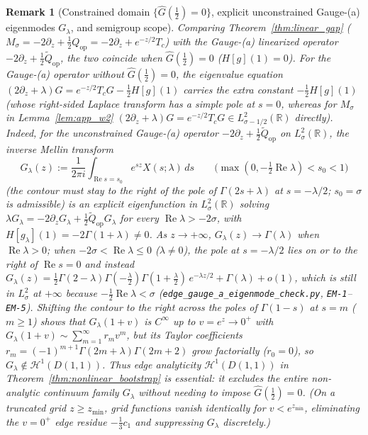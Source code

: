 \documentclass[11pt,a4paper]{article}
\newtheorem{remark}{Remark}
\begin{document}
\begin{remark}[Constrained domain $\{\widehat{G}(\tfrac12)=0\}$, explicit unconstrained Gauge-(a) eigenmodes $G_\lambda$, and semigroup scope]
\label{rem:w3_scope}
Comparing Theorem~\ref{thm:linear_gap} ($M_\sigma=-2\partial_z+\tfrac12 Q_{\mathrm{op}}=-2\partial_z+e^{-z/2}T_c$) with the Gauge-(a) linearized operator $-2\partial_z+\tfrac12\widetilde{Q}_{\mathrm{op}}$, the two coincide when $\widehat{G}(\tfrac12)=0$ ($H[g](1)=0$). For the Gauge-(a) operator without $\widehat{G}(\tfrac12)=0$, the eigenvalue equation $(2\partial_z+\lambda)G=e^{-z/2}T_c G-\tfrac12 H[g](1)$ carries the extra constant $-\tfrac12 H[g](1)$ (whose right-sided Laplace transform has a simple pole at $s=0$, whereas for $M_\sigma$ in Lemma~\ref{lem:app_w2} $(2\partial_z+\lambda)G=e^{-z/2}T_c G\in L^2_{\sigma-1/2}(\mathbb{R})$ directly).
Indeed, for the \emph{unconstrained} Gauge-(a) operator $-2\partial_z+\tfrac12\widetilde{Q}_{\mathrm{op}}$
on $L^2_\sigma(\mathbb{R})$, the inverse Mellin transform
\[
G_\lambda(z) := \frac{1}{2\pi i}\int_{\operatorname{Re}s=s_0} e^{sz}X(s;\lambda)\,ds
\qquad \bigl(\max(0,-\tfrac12\operatorname{Re}\lambda)<s_0<1\bigr)
\]
(the contour must stay to the right of the pole of $\Gamma(2s+\lambda)$ at $s=-\lambda/2$; $s_0=\sigma$ is admissible)
is an explicit eigenfunction in $L^2_\sigma(\mathbb{R})$ solving
$\lambda G_\lambda = -2\partial_z G_\lambda + \tfrac12\widetilde{Q}_{\mathrm{op}}G_\lambda$
for \emph{every} $\operatorname{Re}\lambda>-2\sigma$, with $H[g_\lambda](1)=-2\Gamma(1+\lambda)\ne 0$.
As $z\to+\infty$, $G_\lambda(z)\to\Gamma(\lambda)$ when $\operatorname{Re}\lambda>0$; when
$-2\sigma<\operatorname{Re}\lambda\le 0$ ($\lambda\ne 0$), the pole at $s=-\lambda/2$ lies on or to the right of
$\operatorname{Re}s=0$ and instead
$G_\lambda(z)=\tfrac12\Gamma(2-\lambda)\Gamma(-\tfrac{\lambda}{2})\Gamma(1+\tfrac{\lambda}{2})\,e^{-\lambda z/2}+\Gamma(\lambda)+o(1)$,
which is still in $L^2_\sigma$ at $+\infty$ because $-\tfrac12\operatorname{Re}\lambda<\sigma$
(\texttt{edge\_gauge\_a\_\allowbreak eigenmode\_check.py}, \texttt{EM-1}--\texttt{EM-5}).
Shifting the contour to the right across the poles of $\Gamma(1-s)$ at $s=m$ ($m\ge 1$) shows that $G_\lambda(1+v)$ is $C^\infty$ up to
$v=e^z\to 0^+$ with $G_\lambda(1+v)\sim\sum_{m=1}^\infty r_m v^m$, but its Taylor coefficients
$r_m=(-1)^{m+1}\Gamma(2m+\lambda)\Gamma(2m+2)$ grow factorially ($r_0=0$), so
$G_\lambda\notin\mathcal{H}^1(D(1,1))$.
Thus edge analyticity $\mathcal{H}^1(D(1,1))$ in Theorem~\ref{thm:nonlinear_bootstrap} is
essential: it excludes the entire non-analytic continuum family $G_\lambda$ without needing to
impose $\widehat{G}(\tfrac12)=0$.
(On a truncated grid $z\ge z_{\min}$, grid functions vanish identically for $v<e^{z_{\min}}$,
eliminating the $v=0^+$ edge residue $-\tfrac13 c_1$ and suppressing $G_\lambda$ discretely.)


\end{remark}
\end{document}
